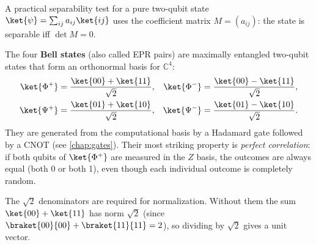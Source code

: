 \documentclass[oneside]{academica}
\begin{document}
A practical separability test for a pure two-qubit state $\ket{\psi}=\sum_{ij}a_{ij}\ket{ij}$ uses the coefficient matrix $M=(a_{ij})$: the state is separable iff $\det M=0$.

The four \textbf{Bell states} (also called EPR pairs) are maximally entangled two-qubit states that form an orthonormal basis for $\mathbb{C}^4$:
\begin{align}\label{bell-states}
  \ket{\Phi^+}&=\frac{\ket{00}+\ket{11}}{\sqrt{2}}, &
  \ket{\Phi^-}&=\frac{\ket{00}-\ket{11}}{\sqrt{2}}, \\
  \ket{\Psi^+}&=\frac{\ket{01}+\ket{10}}{\sqrt{2}}, &
  \ket{\Psi^-}&=\frac{\ket{01}-\ket{10}}{\sqrt{2}}.
\end{align}
They are generated from the computational basis by a Hadamard gate followed by a CNOT (see \autoref{chap:gates}).
Their most striking property is \emph{perfect correlation}: if both qubits of $\ket{\Phi^+}$ are measured in the $Z$ basis, the outcomes are always equal (both 0 or both 1), even though each individual outcome is completely random.

\begin{note}
  The $\sqrt{2}$ denominators are required for normalization.
  Without them the sum $\ket{00}+\ket{11}$ has norm $\sqrt{2}$ (since $\braket{00}{00}+\braket{11}{11}=2$), so dividing by $\sqrt{2}$ gives a unit vector.
\end{note}
\end{document}
